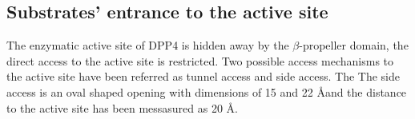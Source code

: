 \subsection{Substrates' entrance to the active site}

The enzymatic active site of DPP4 is hidden away by the $\beta$-propeller domain, the direct access to the active site is restricted. Two possible access mechanisms to the active site have been referred as tunnel access and side access. The The side access is an oval shaped opening with dimensions of 15 and 22 \AA and the distance to the active site has been messasured as 20 \AA.~\cite{Engel_2003}